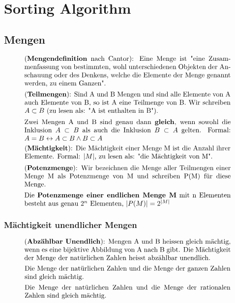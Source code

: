 \documentclass[../Main.tex]{subfiles}
\begin{document}
\chapter{Sorting Algorithm}

\intro{

}

\section{Mengen}

\begin{equation}
    \parbox{30em}{(\textbf{Mengendefinition} nach Cantor): Eine Menge ist "eine Zusammenfassung von bestimmten, wohl unterschiedenen Objekten der Anschauung oder 
    des Denkens, welche die Elemente der Menge genannt werden, zu einem Ganzen".}
\end{equation}
\begin{equation}
    \parbox{30em}{(\textbf{Teilmengen}): Sind A und B Mengen und sind alle Elemente von A
    auch Elemente von B, so ist A eine Teilmenge von B. Wir schreiben \( A \subset B \) (zu 
    lesen als: "A ist enthalten in B").}
\end{equation}
\begin{equation}
    \parbox{30em}{Zwei Mengen A und B sind genau dann \textbf{gleich}, wenn sowohl die Inklusion 
    \(A \subset B\) als auch die Inklusion \( B \subset A\) gelten. 
    Formal: \(A = B \leftrightarrow A \subset B \land B \subset A\)}
\end{equation}
\begin{equation}
    \parbox{30em}{(\textbf{Mächtigkeit}): Die Mächtigkeit einer Menge M ist die Anzahl ihrer 
    Elemente. Formal: \(|M|\), zu lesen als: "die Mächtigkeit von M".}
\end{equation}
\begin{equation}
    \parbox{30em}{(\textbf{Potenzmenge}): Wir bezeichnen die Menge aller Teilmengen einer 
    Menge M als Potenzmenge von M und schreiben P(M) für diese Menge.}
\end{equation}
\begin{equation}
    \parbox{30em}{Die \textbf{Potenzmenge einer endlichen Menge M} mit n Elementen besteht aus 
    genau \(2^n\) Elementen, \(|P(M)|=2^{|M|}\)}
\end{equation}
\subsection{Mächtigkeit unendlicher Mengen}
\begin{equation}
    \parbox{30em}{(\textbf{Abzählbar Unendlich}): Mengen A und B heissen gleich mächtig, wenn es eine bijektive Abbildung von A nach B gibt. Die Mächtigkeit der Menge der natürlichen 
    Zahlen heisst abzählbar unendlich.}
\end{equation}
\begin{equation}
    \parbox{30em}{Die Menge der natürlichen Zahlen und die Menge der ganzen Zahlen sind 
    gleich mächtig.}
\end{equation}
\begin{equation}
    \parbox{30em}{Die Menge der natürlichen Zahlen und die Menge der rationalen Zahlen 
    sind gleich mächtig.}
\end{equation}
\end{document}
